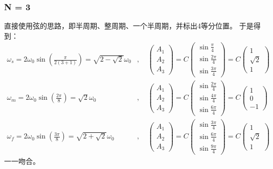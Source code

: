 \documentclass[11pt]{book}
\begin{document}
\subsubsection{N = 3}
\label{sec:orgd2bce7d}
直接使用弦的思路，即半周期、整周期、一个半周期，并标出4等分位置。
于是得到：
\begin{align}
\label{eq:35}
\omega_s = 2\omega_0\sin(\frac{\pi}{2(3+1)})=\sqrt{2-\sqrt{2}}\omega_0 &,\quad
\begin{pmatrix}
A_1\\A_2\\A_3
\end{pmatrix}
=C
\begin{pmatrix}
\sin \frac{\pi}{4}\\\sin \frac{2\pi}{4}\\\sin \frac{3\pi}{4}
\end{pmatrix}=C
\begin{pmatrix}
1\\\sqrt{2}\\1
\end{pmatrix}\\
\omega_m = 2\omega_0\sin(\frac{2\pi}{8})=\sqrt{2}\omega_0 &,\quad
\begin{pmatrix}
A_1\\A_2\\A_3
\end{pmatrix}
=C
\begin{pmatrix}
\sin \frac{2\pi}{4}\\\sin \frac{4\pi}{4}\\\sin \frac{6\pi}{4}
\end{pmatrix}=C
\begin{pmatrix}
1\\0\\-1
\end{pmatrix}\\
\omega_f = 2\omega_0\sin(\frac{3\pi}{8})=\sqrt{2+\sqrt{2}}\omega_0 &,\quad
\begin{pmatrix}
A_1\\A_2\\A_3
\end{pmatrix}
=C
\begin{pmatrix}
\sin \frac{3\pi}{4}\\\sin \frac{6\pi}{4}\\\sin \frac{9\pi}{4}
\end{pmatrix}=C
\begin{pmatrix}
1\\\sqrt{2}\\1
\end{pmatrix}
\end{align}
一一吻合。
\end{document}
